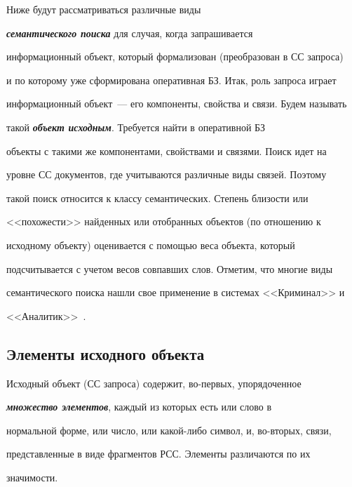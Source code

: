    


    Ниже будут рассматриваться различные виды 


{\bfseries\textit{семантического поиска}} для случая, когда запрашивается 


информационный объект, который формализован (преобразован в СС запроса) 


и по которому уже сформирована оперативная БЗ. Итак, роль запроса играет 


информационный объект~--- его компоненты, свойства и связи. Будем называть 


такой {\bfseries\textit{объект исходным}}. Требуется найти в оперативной БЗ 


объекты с такими же компонентами, свойствами и связями. Поиск идет на 


уровне СС документов, где учитываются различные виды связей. Поэтому 


такой поиск относится к классу семантических. Степень близости или 


<<похожести>> найденных или отобранных объектов (по отношению к 


исходному объекту) оценивается с помощью веса объекта, который 


подсчитывается с учетом весов совпавших слов. Отметим, что многие виды 


семантического поиска нашли свое применение в системах <<Криминал>> и 


<<Аналитик>>~\cite{1-kuz, 3-kuz, 7-kuz, 12-kuz}. 


    


    \subsection{Элементы исходного объекта}


    


    Исходный объект (СС запроса) содержит, во-первых, упорядоченное 


{\bfseries\textit{множество элементов}}, каждый из которых есть или слово в 


нормальной форме, или число, или ка\-кой-ли\-бо символ, и, во-вторых, связи, 


представленные в виде фрагментов РСС. Элементы различаются по их 


значимости.


    


